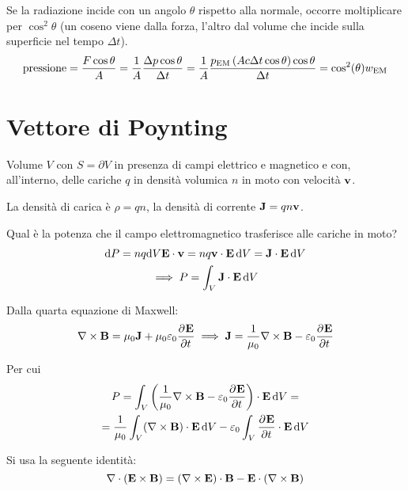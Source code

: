 Se la radiazione incide con un angolo $\theta$ rispetto alla normale, occorre moltiplicare per $\cos^2\theta$ (un coseno viene dalla forza, l'altro dal volume che incide sulla superficie nel tempo $\Delta t$).
\begin{equation}
    \text{pressione} = \frac{F \cos\theta}{A} = \frac{1}{A} \frac{\Delta p \cos \theta}{\Delta t}
    = \frac{1}{A} \frac{p_\mathrm{EM} \left( A c \Delta t \cos \theta \right) \cos \theta}{\Delta t}
    = \cos^2(\theta) w_\mathrm{EM}
\end{equation}


\section{Vettore di Poynting}

Volume $V$ con $S = \partial V$ in presenza di campi elettrico e magnetico e con, all'interno, delle cariche $q$ in densità volumica $n$ in moto con velocità $\mathbf{v}$.

La densità di carica è $\rho = qn$, la densità di corrente $\mathbf{J} = qn\mathbf{v}$.

Qual è la potenza che il campo elettromagnetico trasferisce alle cariche in moto?
\begin{gather}
    \mathrm{d} P = n q \mathrm{d} V \mathbf{E} \cdot \mathbf{v} = n q \mathbf{v} \cdot \mathbf{E} \,\mathrm{d} V = \mathbf{J} \cdot \mathbf{E} \,\mathrm{d} V \\
    \implies P = \int_V \mathbf{J} \cdot \mathbf{E} \,\mathrm{d} V
\end{gather}

Dalla quarta equazione di Maxwell:
\begin{equation}
    \curl \B = \mu_0 \dcurr + \mu_0 \eps_0 \parder[\E]{t}
    \implies
    \dcurr = \frac{1}{\mu_0} \curl \B - \eps_0 \parder[\E]{t}
\end{equation}

Per cui
\begin{equation}
\label{eq:potenza1}
\begin{gathered}
    P = \int_V \pts{\frac{1}{\mu_0} \curl \B - \eps_0 \parder[\E]{t}} \cdot \E \,\de V = \\
    = \frac{1}{\mu_0} \int_V (\curl \B) \cdot \E \,\de V - \eps_0 \int_V \parder[\E]{t} \cdot \E \,\de V
\end{gathered}
\end{equation}

Si usa la seguente identità:
\begin{equation}
    \nabla \cdot (\mathbf{E} \times \mathbf{B}) = (\nabla \times \mathbf{E}) \cdot \mathbf{B} - \mathbf{E} \cdot (\nabla \times \mathbf{B})
\end{equation}

